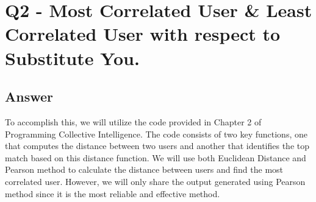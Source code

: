 \documentclass[12pt]{article}
\begin{document}
\clearpage

\section*{Q2 - Most Correlated User & Least Correlated User with respect to Substitute You.}

\subsection*{Answer}
To accomplish this, we will utilize the code provided in Chapter 2 of Programming Collective Intelligence. The code consists of two key functions, one that computes the distance between two users and another that identifies the top match based on this distance function. We will use both Euclidean Distance and Pearson method to calculate the distance between users and find the most correlated user. However, we will only share the output generated using Pearson method since it is the most reliable and effective method.
\\
\end{document}
